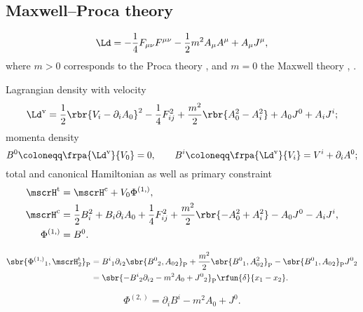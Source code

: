 \documentclass[a4paper,11pt]{article}
\begin{document}
\subsection{Maxwell--Proca theory}

\begin{equation}
\Ld = -\frac{1}{4} F_{\mu\nu} F^{\mu\nu} - \frac{1}{2} m^2 A_\mu A^\mu
+ A_\mu J^\mu,
\end{equation}
where $m > 0$ corresponds to the Proca theory \cite[sec.\ 2.3]{Gitman1990}, and 
$m = 0$ the Maxwell theory \cite[sec.\ 3.3.3]{Rothe2010}, \cite[sec.\ 
2.4]{Gitman1990}.

Lagrangian density with velocity
\begin{equation}
\Ld^\text{v} = \frac{1}{2} \rbr{V_i - \partial_i A_0}^2 - \frac{1}{4} F_{ij}^2 
+ \frac{m^2}{2} \rbr{A_0^2 - A_i^2} + A_0 J^0 + A_i J^i;
\end{equation}
momenta density
\begin{equation}
B^0 \coloneqq \frpa{\Ld^\text{v}}{V_0} = 0,\qquad
B^i \coloneqq \frpa{\Ld^\text{v}}{V_i} = V^i + \partial_i A^0;
\end{equation}
total and canonical Hamiltonian as well as primary constraint
\begin{align}
\mscrH^\text{t} &= \mscrH^\text{c} + V_0 \Phi^{(1,)},\\
\mscrH^\text{c} &= \frac{1}{2} B_i^2 + B_i \partial_i A_0 + \frac{1}{4} 
F_{ij}^2 + \frac{m^2}{2} \rbr{-A_0^2 + A_i^2} - A_0 J^0 - A_i J^i,\\
\Phi^{(1,)} &= B^0.
\end{align}

\begin{align}
\sbr{{\Phi^{(1,)}}_1,{\mscrH^\text{t}_2}}_\text{P} &=
{B^i}_1 {\partial_i}_2 \sbr{{B^0}_2, {A_0}_2}_\text{P} +
\frac{m^2}{2}\sbr{{B^0}_1, {A_0^2}_2}_\text{P} -
\sbr{{B^0}_1, {A_0}_2}_\text{P} {J^0}_2 \nonumber \\
&= \sbr{-{B^i}_2 {\partial_i}_2 - m^2 A_0 + {J^0}_2}_\text{P}
\rfun{\delta}{x_1 - x_2}.
\end{align}

\begin{equation}
\Phi^{(2,)} = \partial_i B^i - m^2 A_0 + J^0.
\end{equation}






\end{document}

